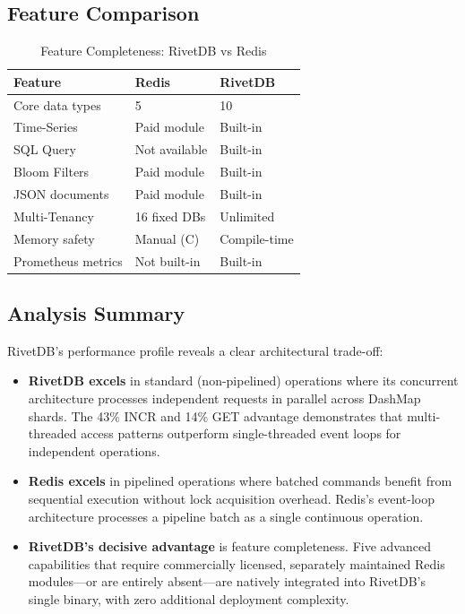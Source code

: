 \documentclass[conference,a4paper]{IEEEtran}
\begin{document}
\subsection{Feature Comparison}

\begin{table}[htbp]
\caption{Feature Completeness: RivetDB vs Redis}
\label{tab:features}
\centering
\begin{tabular}{@{}lll@{}}
\toprule
\textbf{Feature} & \textbf{Redis} & \textbf{RivetDB} \\
\midrule
Core data types & 5 & 10 \\
Time-Series & Paid module & Built-in \\
SQL Query & Not available & Built-in \\
Bloom Filters & Paid module & Built-in \\
JSON documents & Paid module & Built-in \\
Multi-Tenancy & 16 fixed DBs & Unlimited \\
Memory safety & Manual (C) & Compile-time \\
Prometheus metrics & Not built-in & Built-in \\
\bottomrule
\end{tabular}
\end{table}

\subsection{Analysis Summary}

RivetDB's performance profile reveals a clear architectural trade-off:

\begin{itemize}
    \item \textbf{RivetDB excels} in standard (non-pipelined) operations where its concurrent architecture processes independent requests in parallel across DashMap shards. The 43\% INCR and 14\% GET advantage demonstrates that multi-threaded access patterns outperform single-threaded event loops for independent operations.
    \item \textbf{Redis excels} in pipelined operations where batched commands benefit from sequential execution without lock acquisition overhead. Redis's event-loop architecture processes a pipeline batch as a single continuous operation.
    \item \textbf{RivetDB's decisive advantage} is feature completeness. Five advanced capabilities that require commercially licensed, separately maintained Redis modules---or are entirely absent---are natively integrated into RivetDB's single binary, with zero additional deployment complexity.
\end{itemize}
\end{document}
